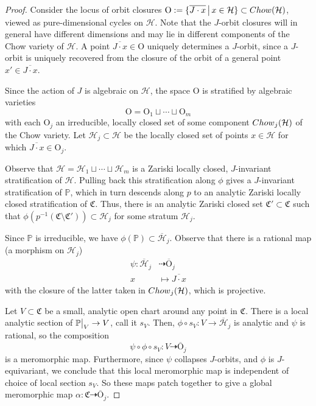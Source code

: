 \documentclass[10pt,letterpaper,english,reqno]{amsart}
\numberwithin{equation}{subsection}
\newcommand\cH{{\mathcal H}}
\newcommand\fC{{\mathfrak C}}
\newcommand\bP{{\mathbb P}}
\newcommand\oO{{\overline O}}
\theoremstyle{definition}
\begin{document}
\begin{proof}

Consider the locus of orbit closures
$\mathrm{O}:=\{\overline{J\cdot x}\,\big{|}\,x\in \cH\}
\subset {\rm Chow}(\cH)$, viewed as pure-dimensional
cycles on $\cH$. Note that the $J$-orbit closures
will in general have different dimensions and may lie
in different components of the Chow variety of $\cH$.
A point $
\overline{J\cdot x}\in \mathrm O$ uniquely 
determines a $J$-orbit, 
since a $J$-orbit is uniquely recovered from the 
closure of the orbit of a general point 
$x'\in \overline{J\cdot x}$.

Since the action of $J$ is algebraic on $\cH$, the space 
$\mathrm O$ is stratified by algebraic varieties
$$\mathrm O = \mathrm O_1\sqcup \cdots \sqcup \mathrm O_m$$ with each $\mathrm O_j$ an irreducible,
locally closed set of some component ${\rm Chow}_j(\cH)$ of the Chow variety.
Let $\cH_j\subset \cH$ be the locally closed set of points $x\in \cH$ for which
$\overline{J\cdot x}\in \mathrm O_j$.

Observe that $\cH = \cH_1\sqcup \cdots \sqcup \cH_m$ 
is a Zariski locally closed, $J$-invariant 
stratification of $\cH$. Pulling back this stratification
along $\phi$ gives a $J$-invariant stratification
of $\bP$, which in turn descends along $p$ to
an analytic Zariski locally closed
stratification of $\fC$. Thus, there is
an analytic Zariski closed set
$\fC'\subset \fC$ such that
$\phi(p^{-1}(\fC\setminus \fC'))\subset \cH_j$ 
for some stratum $\cH_j$.

Since $\bP$ is irreducible, we have $\phi(\bP)\subset \overline{\cH}_j$.
Observe that there is a rational map (a morphism on $\cH_j$)
\begin{align*} \psi\colon \overline{\cH}_j&
\dashrightarrow \overline{\mathrm O}_j \\
x&\mapsto \overline{J\cdot x}\end{align*}
with the closure of the latter taken in ${\rm Chow}_j(\cH)$,
which is projective.

Let $V\subset \fC$ be a small, analytic open 
chart around any point in $\fC$.
There is a local analytic section of $\bP\big{|}_V\to V$,
call it $s_V$.
Then, $\phi\circ s_V\colon V\to \overline{\cH}_j$
is analytic and $\psi$ is rational, so the composition
$$\psi \circ \phi\circ s_V\colon 
V\dashrightarrow {\mathrm \oO}_j$$ is a meromorphic map.
Furthermore, since $\psi$ collapses $J$-orbits, 
and $\phi$ is $J$-equivariant, we conclude that this local 
meromorphic map is independent of choice of local
section $s_V$.
So these maps patch together to give a global
meromorphic map
$\alpha\colon \fC \dashrightarrow {\mathrm \oO}_j.$


\end{proof}
\end{document}
